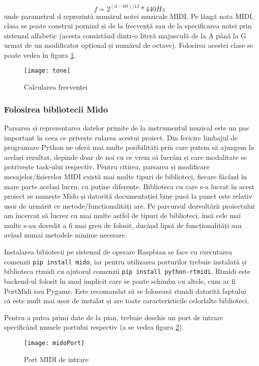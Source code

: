 \documentclass[../IoMusT.tex]{subfiles}
\begin{document}
\[ f = 2^{(d-69)/12} * 440Hz\]
unde parametrul d reprezintă numărul notei muzicale MIDI. Pe lângă nota MIDI, clasa se poate construi pornind și de la frecvență sau de la specificarea notei prin sistemul alfabetic (acesta consistând dintr-o literă majusculă de la A până la G urmat de un modificator opțional și numărul de octave). Folosirea acestei clase se poate vedea în figura \ref{fig:tone}.
\begin{figure}[h]
\centering
\texttt{[image: tone]}
\caption{Calcularea frecvenței}
\label{fig:tone}
\end{figure}

\subsubsection{Folosirea bibliotecii Mido}
Parsarea și reprezentarea datelor primite de la instrumentul muzical este un pas important în ceea ce privește rularea acestui proiect. Din fericire limbajul de programare Python ne oferă mai multe posibilități prin care putem să ajungem la același rezultat, depinde doar de noi cu ce vrem să lucrăm și care modalitate se potrivește task-ului respectiv. Pentru citirea, parsarea și modificare mesajelor/fișierelor MIDI există mai multe tipuri de biblioteci, fiecare făcând în mare parte același lucru, cu puține diferențe. Biblioteca cu care s-a lucrat în acest proiect se numește Mido și datorită documentației bine pusă la punct este relativ ușor de urmărit ce metode/funcționalități are. Pe parcursul dezvoltării proiectului am încercat să lucrez cu mai multe astfel de tipuri de biblioteci, însă cele mai multe s-au dovedit a fi mai greu de folosit, ducănd lipsă de funcționalități sau având numai metodele minime necesare.
\\
\par Instalarea bibiotecii pe sistemul de operare Raspbian se face cu executarea comenzii \verb|pip install mido|, iar pentru utilizarea porturilor trebuie instalată și biblioteca rtmidi cu ajutorul comenzii \verb|pip install python-rtmidi|. Rtmidi este backend-ul folosit în mod implicit care se poate schimba cu altele, cum ar fi PortMidi sau Pygame. Este recomandat să se foloseasă rtmidi datorită faptului că este mult mai ușor de instalat și are toate caracteristicile celorlalte biblioteci. 
\\
\par Pentru a putea primi date de la pian, trebuie deschis un port de intrare specificând numele portului respectiv (a se vedea figura \ref{fig:port}).
\begin{figure}[h]
\centering
\texttt{[image: midoPort]}
\caption{Port MIDI de intrare}
\label{fig:port}
\end{figure}
\end{document}
